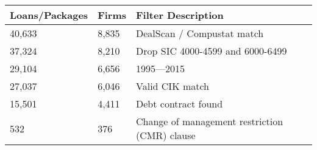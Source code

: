 \begin{tabular}{lll}
	\toprule
	Loans/Packages & Firms & Filter Description                            \\
	\midrule
	40,633         & 8,835 & DealScan / Compustat match                    \\
    37,324         & 8,210 & Drop SIC 4000-4599 and 6000-6499              \\
	29,104         & 6,656 & 1995–--2015                                   \\
	27,037         & 6,046 & Valid CIK match                               \\
	15,501         & 4,411 & Debt contract found                           \\
    532            & 376   & Change of management restriction (CMR) clause \\
	\bottomrule
\end{tabular}
